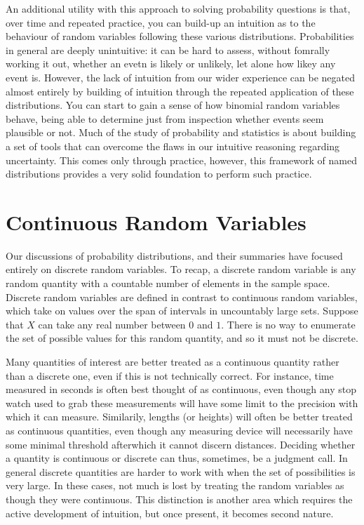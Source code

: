 \documentclass[
  letterpaper,
  DIV=11,
  numbers=noendperiod]{scrreprt}
\begin{document}
An additional utility with this approach to solving probability
questions is that, over time and repeated practice, you can build-up an
intuition as to the behaviour of random variables following these
various distributions. Probabilities in general are deeply unintuitive:
it can be hard to assess, without fomrally working it out, whether an
evetn is likely or unlikely, let alone how likey any event is. However,
the lack of intuition from our wider experience can be negated almost
entirely by building of intuition through the repeated application of
these distributions. You can start to gain a sense of how binomial
random variables behave, being able to determine just from inspection
whether events seem plausible or not. Much of the study of probability
and statistics is about building a set of tools that can overcome the
flaws in our intuitive reasoning regarding uncertainty. This comes only
through practice, however, this framework of named distributions
provides a very solid foundation to perform such practice.

\chapter{Continuous Random Variables}\label{continuous-random-variables}

Our discussions of probability distributions, and their summaries have
focused entirely on discrete random variables. To recap, a discrete
random variable is any random quantity with a countable number of
elements in the sample space. Discrete random variables are defined in
contrast to continuous random variables, which take on values over the
span of intervals in uncountably large sets. Suppose that \(X\) can take
any real number between \(0\) and \(1\). There is no way to enumerate
the set of possible values for this random quantity, and so it must not
be discrete.

Many quantities of interest are better treated as a continuous quantity
rather than a discrete one, even if this is not technically correct. For
instance, time measured in seconds is often best thought of as
continuous, even though any stop watch used to grab these measurements
will have some limit to the precision with which it can measure.
Similarily, lengths (or heights) will often be better treated as
continuous quantities, even though any measuring device will necessarily
have some minimal threshold afterwhich it cannot discern distances.
Deciding whether a quantity is continuous or discrete can thus,
sometimes, be a judgment call. In general discrete quantities are harder
to work with when the set of possibilities is very large. In these
cases, not much is lost by treating the random variables as though they
were continuous. This distinction is another area which requires the
active development of intuition, but once present, it becomes second
nature.
\end{document}
